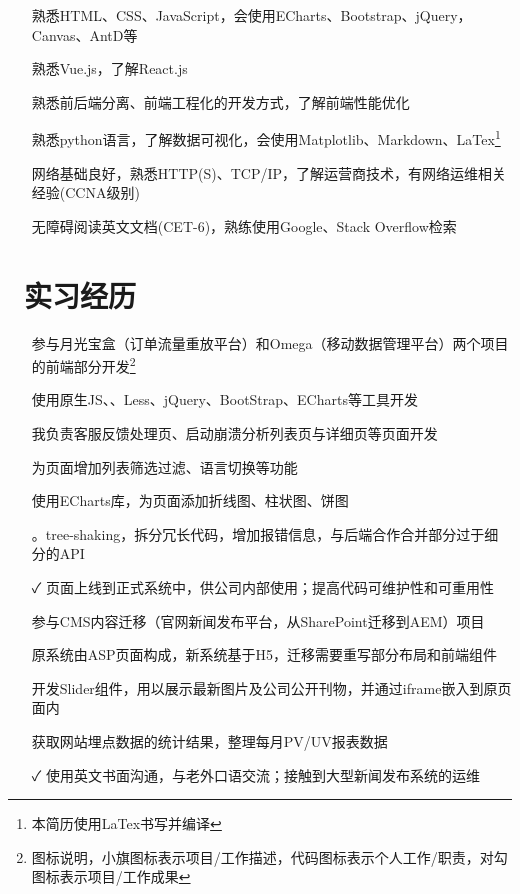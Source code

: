 \documentclass[14pt]{resume}
\begin{document}
\begin{itemize}
    \item[\faTree] 熟悉HTML、CSS、JavaScript，会使用ECharts、Bootstrap、jQuery，Canvas、AntD等
    \item[\faTree] 熟悉Vue.js，了解React.js
    \item[\faTree] 熟悉前后端分离、前端工程化的开发方式，了解前端性能优化
    \item[\faTree] 熟悉python语言，了解数据可视化，会使用Matplotlib、Markdown、LaTex\footnote{本简历使用LaTex书写并编译}
    \item[\faTree] 网络基础良好，熟悉HTTP(S)、TCP/IP，了解运营商技术，有网络运维相关经验(CCNA级别)
    \item[\faTree] 无障碍阅读英文文档(CET-6)，熟练使用Google、Stack Overflow检索
\end{itemize}

\section{\faBriefcase\ 实习经历}
\begin{itemize}
    \item[\faFlagO] 参与月光宝盒（订单流量重放平台）和Omega（移动数据管理平台）两个项目的前端部分开发\footnote{图标说明，小旗图标表示项目/工作描述，代码图标表示个人工作/职责，对勾图标表示项目/工作成果}
    \item[\faFlagO] 使用原生JS、\textbf{\color{red}{模板引擎Simplite}}、Less、jQuery、BootStrap、ECharts等工具开发
    \item[\faCode] 我负责客服反馈处理页、启动崩溃分析列表页与详细页等页面开发
    \item[\faCode] 为页面增加列表筛选过滤、语言切换等功能
    \item[\faCode] 使用ECharts库，为页面添加折线图、柱状图、饼图
    \item[\faCode] \textbf{\color{red}{代码重构}}。tree-shaking，拆分冗长代码，增加报错信息，与后端合作合并部分过于细分的API
    \item[\faCheck] 页面上线到正式系统中，供公司内部使用；提高代码可维护性和可重用性
\end{itemize}

\begin{itemize}
    \item[\faFlagO] 参与CMS内容迁移（官网新闻发布平台，从SharePoint迁移到AEM）项目
    \item[\faFlagO] 原系统由ASP页面构成，新系统基于H5，迁移需要重写部分布局和前端组件
    \item[\faCode] 开发Slider组件，用以展示最新图片及公司公开刊物，并通过iframe嵌入到原页面内
    \item[\faCode] 获取网站埋点数据的统计结果，整理每月PV/UV报表数据
    \item[\faCheck] 使用英文书面沟通，与老外口语交流；接触到大型新闻发布系统的运维
\end{itemize}
\end{document}
